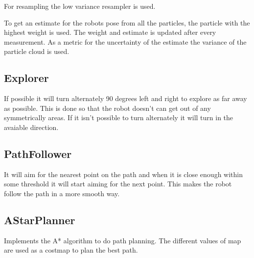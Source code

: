 For resampling the low variance resampler is used.

To get an estimate for the robots pose from all the particles, the particle with the highest weight is used.
The weight and estimate is updated after every measurement.
As a metric for the uncertainty of the estimate the variance of the particle cloud is used.

\subsection{Explorer}
If possible it will turn alternately 90 degrees left and right to explore as far away as possible.
This is done so that the robot doesn't can get out of any symmetrically areas.
If it isn't possible to turn alternately it will turn in the avaiable direction.

\subsection{PathFollower}
It will aim for the nearest point on the path and when it is close enough within some threshold it will start aiming for the next point.
This makes the robot follow the path in a more smooth way.

\subsection{AStarPlanner}
Implements the A* algorithm to do path planning. The different values of map are used as a costmap to plan the best path.



